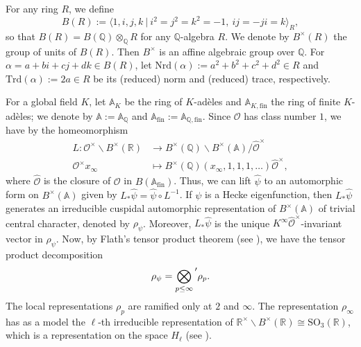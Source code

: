 \documentclass[11pt]{amsart}
\newcommand{\bigo}{\mathcal{O}}
\newcommand{\R}{\mathbb{R}}
\newcommand{\Q}{\mathbb{Q}}
\newcommand{\A}{\mathbb{A}}
\newcommand{\trd}[1]{\mathrm{Trd}\left(#1\right)}
\newcommand{\nrd}[1]{\mathrm{Nrd}\left(#1\right)}
\theoremstyle{definition}
\theoremstyle{remark}
\begin{document}
For any ring $R$, we define $$B(R) := \langle 1,i,j,k \: | \: i^2=j^2=k^2=-1, \: ij=-ji=k\rangle_R,$$ so that $B(R) = B(\Q) \otimes_{\Q} R$ for any $\Q$-algebra $R$. We denote by $B^{\times}(R)$ the group of units of $B(R)$. Then $B^{\times}$ is an affine algebraic group over $\Q$. For $\alpha = a+bi+cj+dk \in B(R)$, let $\nrd{\alpha} := a^2+b^2+c^2+d^2 \in R$ and $\trd{\alpha} := 2a \in R$ be its (reduced) norm and (reduced) trace, respectively.

For a global field $K$, let $\A_{K}$ be the ring of $K$-adèles and $\A_{K,\text{fin}}$ the ring of finite $K$-adèles; we denote by $\A := \A_{\Q}$ and $\A_{\text{fin}} := \A_{\Q,\text{fin}}$. Since $\bigo$ has class number $1$, we have by \cite[eq. (2.20)]{AutRepGetz} the homeomorphism 
\begin{align}
    L : \bigo^{\times} \backslash B^{\times}(\R) &\longrightarrow B^{\times}(\Q) \backslash B^{\times}(\A) / \widehat{\bigo}^{\times} \label{homeo2.20Bcross} \\
    \bigo^{\times} x_{\infty} &\longmapsto B^{\times}(\Q) (x_{\infty},1,1,1,\dots ) \widehat{\bigo}^{\times}, \nonumber
\end{align}
where $\widehat{\bigo}$ is the closure of $\bigo$ in $B(\A_{\text{fin}})$. Thus, we can lift $\widehat{\psi}$ to an automorphic form on $B^{\times}(\A)$ given by $L_{*} \widehat{\psi} = \widehat{\psi} \circ L^{-1}$. If $\psi$ is a Hecke eigenfunction, then $L_{*} \widehat{\psi}$ generates an irreducible cuspidal automorphic representation of $B^{\times}(\A)$ of trivial central character, denoted by $\rho_{\psi}$. Moreover, $L_{*} \widehat{\psi}$ is the unique $K^{\infty} \widehat{\bigo}^{\times}$-invariant vector in $\rho_{\psi}$. Now, by Flath's tensor product theorem (see \cite[Thm. 6.3.4]{AutRepGetz}), we have the tensor product decomposition 
\begin{equation}
    \rho_{\psi} = \bigotimes_{p\leq \infty} {\vphantom{\sum}}' \rho_{p}. \label{Flath}
\end{equation}
The local representations $\rho_p$ are ramified only at $2$ and $\infty$. The representation $\rho_{\infty}$ has as a model the $\ell$-th irreducible representation of $\R^{\times} \backslash B^{\times}(\R) \cong \mathrm{SO}_3(\R)$, which is a representation on the space $H_\ell$ (see \cite[Thm. 17.12]{QuantumTheoryforMath}).
\end{document}
